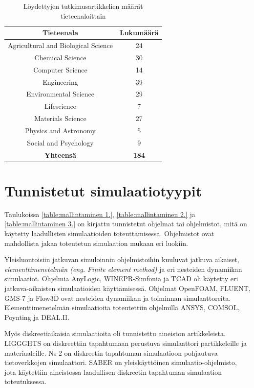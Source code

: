 \documentclass[utf8]{gradu3}
\begin{document}
\begin{table}[ht]
    \centering
    \begin{tabular}{|c|c|}
        \hline
        \textbf{Tieteenala} & \textbf{Lukumäärä} \\
        \hline
        Agricultural and Biological Science & 24 \\
        \hline
        Chemical Science & 30 \\
        \hline
        Computer Science & 14 \\
        \hline
        Engineering & 39 \\
        \hline
        Environmental Science & 29 \\
        \hline
        Lifescience & 7 \\
        \hline
        Materials Science & 27 \\
        \hline
        Physics and Astronomy & 5 \\
        \hline
        Social and Psychology & 9 \\
        \hline
        \textbf{Yhteensä} & \textbf{184} \\
        \hline
    \end{tabular}
    \caption{Löydettyjen tutkimusartikkelien määrät tieteenaloittain}
    \label{tab:tieteenalat lkm}
\end{table}

\section{Tunnistetut simulaatiotyypit} \label{selitys}
Taulukoissa \ref{table:mallintaminen 1.}, \ref{table:mallintaminen 2.} 
ja \ref{table:mallintaminen 3.} on kirjattu tunnistetut ohjelmat tai ohjelmistot,
mitä on käytetty laadullisten simulaatioiden toteuttamisessa. 
Ohjelmistot ovat mahdollista jakaa toteutetun simulaation mukaan eri luokiin.

Yleisluontoisiin jatkuvan simuloinnin ohjelmistoihin kuuluvat
jatkuva aikaiset, \textit{elementtimenetelmän (eng. Finite element method)}
ja eri nesteiden dynamiikan simulaatiot.
Ohjelmia AnyLogic, WINEPR-Simfonia ja TCAD 
oli käytetty eri jatkuva-aikaisten simulaatioiden käyttämisessä.
Ohjelmat OpenFOAM, FLUENT, GMS-7 ja Flow3D 
ovat nesteiden dynamiikan ja toiminnan simulaattoreita.
Elementtimenetelmän simulaatioita toteutettiin ohjelmilla 
ANSYS, COMSOL, Poynting ja DEAL.II.

Myös diskreetiaikaisia simulaatioita oli tunnistettu aineiston artikkeleista.
LIGGGHTS on diskreettiin tapahtumaan perustuva simulaattori partikkeleille ja materiaaleille. 
Ns-2 on diskreetin tapahtuman simulaatioon pohjautuva tietoverkkojen simulaattori.
SABER on yleiskäyttöinen simulaatio-ohjelmisto, 
jota käytettiin aineistossa laadullisen diskreetin tapahtuman simulaation toteutuksessa.
\end{document}
